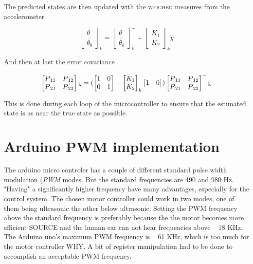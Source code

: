 \documentclass[a4paper,11pt]{kth-mag}
\begin{document}
The predicted states are then updated with the \textsc{weighed} measures from the accelerometer

\begin{equation}
\begin{bmatrix}
\theta \\
\dot{\theta_b}
\end{bmatrix}_k
=
\begin{bmatrix}
\theta \\
\dot{\theta_b}
\end{bmatrix}_k^-
+
\begin{bmatrix}
K_1 \\ K_2
\end{bmatrix}_k
\textbf{$\tilde{y}$}
\end{equation}

And then at last the error covariance

\begin{equation}
\begin{bmatrix}
P\textsubscript{11} & P\textsubscript{12} \\
P\textsubscript{21} & P\textsubscript{22}
\end{bmatrix}\textsubscript{k} 
=(
 \begin{bmatrix}
1 & 0 \\
0 & 1
\end{bmatrix}
-
\begin{bmatrix}
K_1 \\ K_2
\end{bmatrix}_k
\begin{bmatrix}
1 & 0
\end{bmatrix}
)
\begin{bmatrix}
P\textsubscript{11} & P\textsubscript{12} \\
P\textsubscript{21} & P\textsubscript{22}
\end{bmatrix}^-\textsubscript{k}
\end{equation}


This is done during each loop of the microcontroller to ensure that the estimated state is as near the true state as possible.

\section{Arduino PWM implementation} \label{app: PWM}
The arduino micro controler has a couple of different standard pulse width modulation (\textit{PWM} modes. But the standard frequencies are 490 and 980 Hz. "Having" a significantly higher 
frequency have many advantages, especially for the control system. The chosen motor controller could work in two modes, one of them being ultrasonic the other below ultrasonic. Setting the PWM frequency above the standard frequency is preferably because the the motor becomes more efficient \textsc{SOURCE} and the human ear can not hear frequencies above ~ 18 KHz. The Arduino uno's maximum PWM frequency is ~ 61 KHz, which is too much for the motor controller \textsc{WHY}. A bit of register manipulation had to be 
done to accomplish an acceptable PWM frequency.
\end{document}
